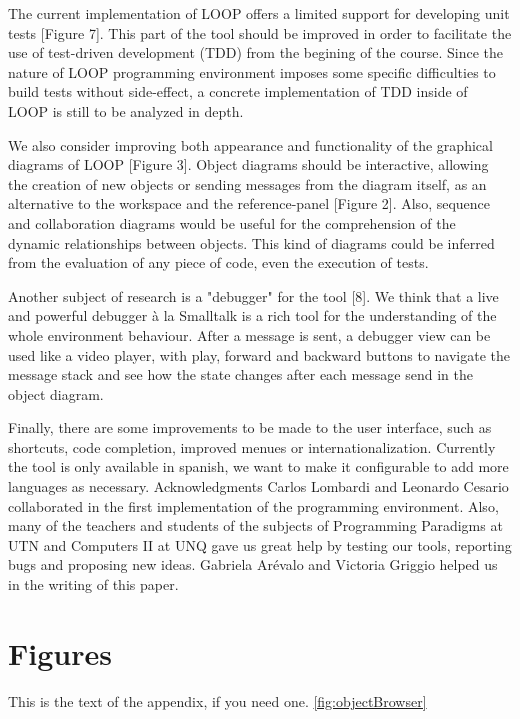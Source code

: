 \documentclass{sigplanconf}
\begin{document}
The current implementation of LOOP offers a limited support for developing unit tests [Figure 7]. This part of the tool should be improved in order to facilitate the use of test-driven development (TDD) from the begining of the course. Since the nature of LOOP programming environment imposes some specific difficulties to build tests without side-effect, a concrete implementation of TDD inside of LOOP is still to be analyzed in depth.

We also consider improving both appearance and functionality of the graphical diagrams of LOOP [Figure 3]. Object diagrams should be interactive, allowing the creation of new objects or sending messages from the diagram itself, as an alternative to the workspace and the reference-panel [Figure 2]. Also, sequence and collaboration diagrams would be useful for the comprehension of the dynamic relationships between objects. This kind of diagrams could be inferred from the evaluation of any piece of code, even the execution of tests.

Another subject of research is a "debugger" for the tool [8]. We think that a live and powerful debugger à la Smalltalk is a rich tool for the understanding of the whole environment behaviour. 
After a message is sent, a debugger view can be used like a video player, with play, forward and  backward buttons to navigate the message stack and see how the state changes after each message send in the object diagram.

Finally, there are some improvements to be made to the user interface, such as shortcuts, code completion, improved menues or internationalization. Currently the tool is only available in spanish, we want to make it configurable to add more languages as necessary.
Acknowledgments
Carlos Lombardi and Leonardo Cesario collaborated in the first implementation of the programming environment. Also, many of the teachers and students of the subjects of Programming Paradigms at UTN and Computers II at UNQ gave us great help by testing our tools, reporting bugs and proposing new ideas. Gabriela Arévalo and Victoria Griggio helped us in the writing of this paper.

\appendix
\section{Figures}

This is the text of the appendix, if you need one. \ref{fig:objectBrowser}
\end{document}
